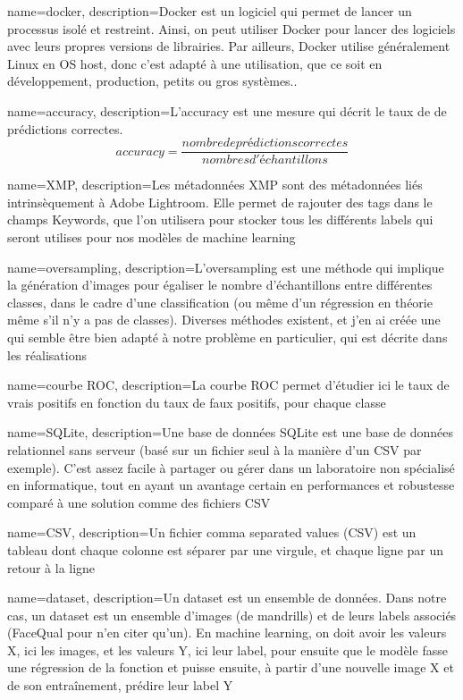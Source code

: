 {
    name=docker,
    description={Docker est un logiciel qui permet de lancer un processus isolé et restreint. Ainsi, on peut utiliser Docker pour lancer des logiciels avec leurs propres versions de librairies. Par ailleurs, Docker utilise généralement Linux en OS host, donc c'est adapté à une utilisation, que ce soit en développement, production, petits ou gros systèmes..}
}

{
    name=accuracy,
    description={L'accuracy est une mesure qui décrit le taux de de prédictions correctes.
    \begin{equation}
        accuracy = \frac{nombre de prédictions correctes}{nombres d'échantillons}
    \end{equation}}
}

{
    name=XMP,
    description={Les métadonnées XMP sont des métadonnées liés intrinsèquement à Adobe Lightroom. Elle permet de rajouter des tags dans le champs Keywords, que l'on utilisera pour stocker tous les différents labels qui seront utilises pour nos modèles de machine learning}
}

{
    name=oversampling,
    description={L'oversampling est une méthode qui implique la génération d'images pour égaliser le nombre d'échantillons entre différentes classes, dans le cadre d'une classification (ou même d'un régression en théorie même s'il n'y a pas de classes). Diverses méthodes existent, et j'en ai créée une qui semble être bien adapté à notre problème en particulier, qui est décrite dans les réalisations}
}

{
    name=courbe ROC,
    description={La courbe ROC permet d'étudier ici le taux de vrais positifs en fonction du taux de faux positifs, pour chaque classe}
}

{
    name=SQLite,
    description={Une base de données SQLite est une base de données relationnel sans serveur (basé sur un fichier seul à la manière d'un CSV par exemple). C'est assez facile à partager ou gérer dans un laboratoire non spécialisé en informatique, tout en ayant un avantage certain en performances et robustesse comparé à une solution comme des fichiers CSV}
}

{
    name=CSV,
    description={Un fichier comma separated values (CSV) est un tableau dont chaque colonne est séparer par une virgule, et chaque ligne par un retour à la ligne}
}

{
    name=dataset,
    description={Un dataset est un ensemble de données. Dans notre cas, un dataset est un ensemble d'images (de mandrills) et de leurs labels associés (FaceQual pour n'en citer qu'un). En machine learning, on doit avoir les valeurs X, ici les images, et les valeurs Y, ici leur label, pour ensuite que le modèle fasse une régression de la fonction et puisse ensuite, à partir d'une nouvelle image X et de son entraînement, prédire leur label Y}
}